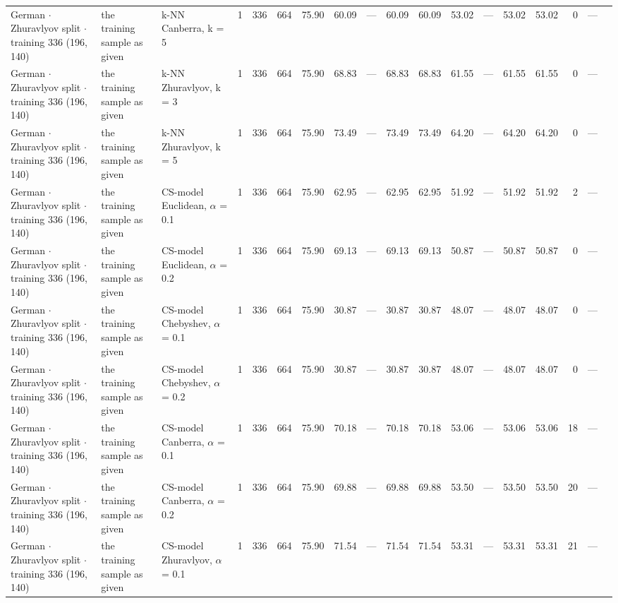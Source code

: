 \begin{longtable}{lllrrrrrrrrrrrrrrl}
  German $\cdot$ Zhuravlyov split $\cdot$ training 336 (196, 140) & the training sample as given & k-NN Canberra, k = 5 & 1 & 336 & 664 & 75.90 & 60.09 & --- & 60.09 & 60.09 & 53.02 & --- & 53.02 & 53.02 & 0 & --- &  \\
  German $\cdot$ Zhuravlyov split $\cdot$ training 336 (196, 140) & the training sample as given & k-NN Zhuravlyov, k = 3 & 1 & 336 & 664 & 75.90 & 68.83 & --- & 68.83 & 68.83 & 61.55 & --- & 61.55 & 61.55 & 0 & --- &  \\
  German $\cdot$ Zhuravlyov split $\cdot$ training 336 (196, 140) & the training sample as given & k-NN Zhuravlyov, k = 5 & 1 & 336 & 664 & 75.90 & 73.49 & --- & 73.49 & 73.49 & 64.20 & --- & 64.20 & 64.20 & 0 & --- &  \\
  German $\cdot$ Zhuravlyov split $\cdot$ training 336 (196, 140) & the training sample as given & CS-model Euclidean, $\alpha$ = 0.1 & 1 & 336 & 664 & 75.90 & 62.95 & --- & 62.95 & 62.95 & 51.92 & --- & 51.92 & 51.92 & 2 & --- &  \\
  German $\cdot$ Zhuravlyov split $\cdot$ training 336 (196, 140) & the training sample as given & CS-model Euclidean, $\alpha$ = 0.2 & 1 & 336 & 664 & 75.90 & 69.13 & --- & 69.13 & 69.13 & 50.87 & --- & 50.87 & 50.87 & 0 & --- &  \\
  German $\cdot$ Zhuravlyov split $\cdot$ training 336 (196, 140) & the training sample as given & CS-model Chebyshev, $\alpha$ = 0.1 & 1 & 336 & 664 & 75.90 & 30.87 & --- & 30.87 & 30.87 & 48.07 & --- & 48.07 & 48.07 & 0 & --- &  \\
  German $\cdot$ Zhuravlyov split $\cdot$ training 336 (196, 140) & the training sample as given & CS-model Chebyshev, $\alpha$ = 0.2 & 1 & 336 & 664 & 75.90 & 30.87 & --- & 30.87 & 30.87 & 48.07 & --- & 48.07 & 48.07 & 0 & --- &  \\
  German $\cdot$ Zhuravlyov split $\cdot$ training 336 (196, 140) & the training sample as given & CS-model Canberra, $\alpha$ = 0.1 & 1 & 336 & 664 & 75.90 & 70.18 & --- & 70.18 & 70.18 & 53.06 & --- & 53.06 & 53.06 & 18 & --- &  \\
  German $\cdot$ Zhuravlyov split $\cdot$ training 336 (196, 140) & the training sample as given & CS-model Canberra, $\alpha$ = 0.2 & 1 & 336 & 664 & 75.90 & 69.88 & --- & 69.88 & 69.88 & 53.50 & --- & 53.50 & 53.50 & 20 & --- &  \\
  German $\cdot$ Zhuravlyov split $\cdot$ training 336 (196, 140) & the training sample as given & CS-model Zhuravlyov, $\alpha$ = 0.1 & 1 & 336 & 664 & 75.90 & 71.54 & --- & 71.54 & 71.54 & 53.31 & --- & 53.31 & 53.31 & 21 & --- &  \\

\end{longtable}
